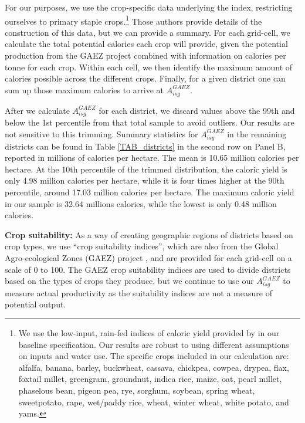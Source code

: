 \documentclass[12pt]{article}
\begin{document}
For our purposes, we use the crop-specific data underlying the \citet{galorozak2016} index, restricting ourselves to primary staple crops.\footnote{We use the low-input, rain-fed indices of caloric yield provided by \citet{galorozak2016} in our baseline specification. Our results are robust to using different assumptions on inputs and water use. The specific crops included in our calculation are: alfalfa, banana, barley, buckwheat, cassava, chickpea, cowpea, drypea, flax, foxtail millet, greengram, groundnut, indica rice, maize, oat, pearl millet, phaselous bean, pigeon pea, rye, sorghum, soybean, spring wheat, sweetpotato, rape, wet/paddy rice, wheat, winter wheat, white potato, and yams.} Those authors provide details of the construction of this data, but we can provide a summary. For each grid-cell, we calculate the total potential calories each crop will provide, given the potential production from the GAEZ project \citep{gaez} combined with information on calories per tonne for each crop. Within each cell, we then identify the maximum amount of calories possible across the different crops. Finally, for a given district one can sum up those maximum calories to arrive at $A^{GAEZ}_{isg}$.

After we calculate $A^{GAEZ}_{isg}$ for each district, we discard values above the 99th and below the 1st percentile from that total sample to avoid outliers. Our results are not sensitive to this trimming. Summary statistics for $A^{GAEZ}_{isg}$ in the remaining districts can be found in Table \ref{TAB_districts} in the second row on Panel B, reported in millions of calories per hectare. The mean is 10.65 million calories per hectare. At the 10th percentile of the trimmed distribution, the caloric yield is only 4.98 million calories per hectare, while it is four times higher at the 90th percentile, around 17.03 million calories per hectare. The maximum caloric yield in our sample is 32.64 millions calories, while the lowest is only 0.48 million calories. 

\vspace{.5cm}\noindent\textbf{Crop suitability:} As a way of creating geographic regions of districts based on crop types, we use ``crop suitability indices'', which are also from the Global Agro-ecological Zones (GAEZ) project \citep{gaez}, and are provided for each grid-cell on a scale of 0 to 100. The GAEZ crop suitability indices are used to divide districts based on the types of crops they produce, but we continue to use our $A^{GAEZ}_{isg}$ to measure actual productivity as the suitability indices are not a measure of potential output.
\end{document}
